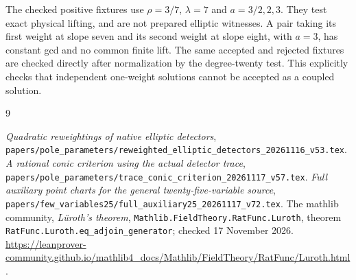 \documentclass[11pt,a4paper]{article}
\begin{document}
The checked positive fixtures use $\rho=3/7$, $\lambda=7$ and
$a=3/2,2,3$. They test exact physical lifting, and are not prepared
elliptic witnesses. A pair taking its first weight at slope seven
and its second weight at slope eight, with $a=3$, has constant gcd
and no common finite lift. The same accepted and rejected fixtures
are checked directly after normalization by the degree-twenty test.
This explicitly checks that independent
one-weight solutions cannot be accepted as a coupled solution.

\begin{thebibliography}{9}\raggedright
{}\emph{Quadratic reweightings of native elliptic detectors},
\nolinkurl{papers/pole_parameters/reweighted_elliptic_detectors_20261116_v53.tex}.
\emph{A rational conic criterion using the actual detector trace},
\nolinkurl{papers/pole_parameters/trace_conic_criterion_20261117_v57.tex}.
\emph{Full auxiliary point charts for the general twenty-five-variable source},
\nolinkurl{papers/few_variables25/full_auxiliary25_20261117_v72.tex}.
The mathlib community, \emph{L\"uroth's theorem},
\texttt{Mathlib.FieldTheory.RatFunc.Luroth}, theorem
\texttt{RatFunc.Luroth.eq\_adjoin\_generator}; checked 17 November 2026.
\url{https://leanprover-community.github.io/mathlib4_docs/Mathlib/FieldTheory/RatFunc/Luroth.html}.
\end{thebibliography}
\end{document}
